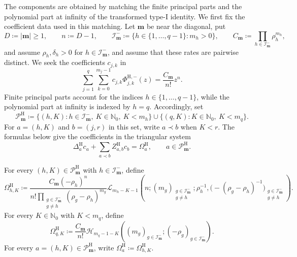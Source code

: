 \documentclass[10pt]{amsart}
\newcommand{\Nzero}{\mathbb N_0}
\newcommand{\mm}{\boldsymbol m}
\newcommand{\abs}[1]{\lvert#1\rvert}
\theoremstyle{plain}
\theoremstyle{definition}
\theoremstyle{remark}
\begin{document}
The components are obtained by matching the finite principal parts and
the polynomial part at infinity of the transformed type-I identity.  We
first fix the coefficient data used in this matching.  Let \(\mm\) be
near the diagonal, put
\[
 D\coloneq\abs\mm\ge1,\qquad n\coloneq D-1,\qquad
 \mathcal I_{\mm}^-\coloneq\{h\in\{1,\ldots,q-1\}:m_h>0\},\qquad
 C_{\mm}\coloneq\prod_{h\in\mathcal I_{\mm}^-}\rho_h^{m_h},
\]
and assume \(\rho_h,\delta_h>0\) for
\(h\in\mathcal I_{\mm}^-\), and assume that these rates are pairwise
distinct. We seek the coefficients \(c_{j,k}\) in
\begin{equation}
 \sum_{j=1}^q\sum_{k=0}^{m_j-1}
 c_{j,k}\Phi_{j,k}^{\mathrm H,-}(z)
 =\frac{C_{\mm}}{n!}z^n.
 \label{eq:Hermite-explicit-transformed-identity}
\end{equation}
Finite principal parts account for the indices
\(h\in\{1,\ldots,q-1\}\), while the
polynomial part at infinity is indexed by \(h=q\). Accordingly, set
\[
 \mathscr P_{\mm}^{\mathrm H}
 \coloneq\{(h,K):h\in\mathcal I_{\mm}^-,\
 K\in\Nzero,\ K<m_h\}
 \cup\{(q,K):K\in\Nzero,\ K<m_q\}.
\]
For \(a=(h,K)\) and \(b=(j,r)\) in this set, write \(a\prec b\) when
\(K<r\). The formulas below give the coefficients in the triangular
system
\begin{equation}
 \Delta_a^{\mathrm H}c_a+
 \sum_{a\prec b}Z_{a,b}^{\mathrm H}c_b
 =\Omega_a^{\mathrm H},
 \qquad a\in\mathscr P_{\mm}^{\mathrm H}.
 \label{eq:Hermite-explicit-triangular-system}
\end{equation}

For every \((h,K)\in\mathscr P_{\mm}^{\mathrm H}\) with
\(h\in\mathcal I_{\mm}^-\), define
\begin{equation}
 \Omega_{h,K}^{\mathrm H}
 \coloneq\frac{C_{\mm}(-\rho_h)^n}
 {n!\displaystyle\prod_{\substack{g\in\mathcal I_{\mm}^-\\g\ne h}}
       (\rho_g-\rho_h)^{m_g}}
 \mathscr L_{m_h-K-1}
 \left(
 n;(m_g)_{\substack{g\in\mathcal I_{\mm}^-\\g\ne h}};
 \rho_h^{-1},
 \bigl(-(\rho_g-\rho_h)^{-1}\bigr)_{
       \substack{g\in\mathcal I_{\mm}^-\\g\ne h}}
 \right).
 \label{eq:Hermite-explicit-target-finite}
\end{equation}
For every \(K\in\Nzero\) with \(K<m_q\), define
\begin{equation}
 \Omega_{q,K}^{\mathrm H}
 \coloneq\frac{C_{\mm}}{n!}
 \mathscr H_{m_q-1-K}
 \left((m_g)_{g\in\mathcal I_{\mm}^-};
       (-\rho_g)_{g\in\mathcal I_{\mm}^-}\right).
 \label{eq:Hermite-explicit-target-infinity}
\end{equation}
For every \(a=(h,K)\in\mathscr P_{\mm}^{\mathrm H}\), write
\(\Omega_a^{\mathrm H}\coloneq\Omega_{h,K}^{\mathrm H}\).
\end{document}
